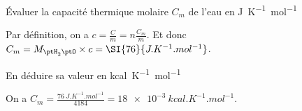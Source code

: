 \debutEntrainement


\begin{enonce}
Évaluer la capacité thermique molaire $C_m$ de l'eau %
en \si{J.K^{-1}.mol^{-1}}
\end{enonce}


\begin{corrige}
Par définition, on a $c=\frac{C}{m}=n\frac{C_m}{m}$. Et donc $C_m={M}_{\ptH_2\ptO}\times c=\SI{76 }{J.K^{-1}.mol^{-1}}$.
\end{corrige}




\begin{enonce}
	En déduire sa valeur en \si{kcal.K^{-1}.mol^{-1}}
\end{enonce}


\begin{corrige}
	 On a $C_m=\frac{\SI{76 }{J.K^{-1}.mol^{-1}}}{4184}=\SI{18e-3 }{kcal.K^{-1}.mol^{-1}}$.
\end{corrige}



\hauteurLargeurCadreReponse		{8mm}{4cm}
\initialisationEntrainement

